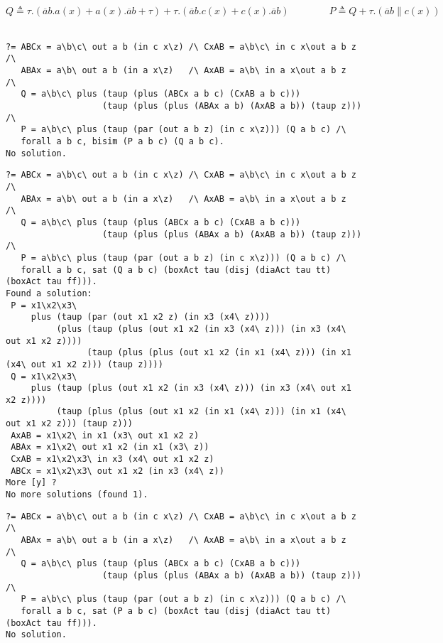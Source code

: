 \documentclass{article}
\newcommand{\ttt}{\mathtt{t\hspace*{-.25em}t}}
\newcommand{\fff}{\mathtt{f\hspace*{-.25em}f}}
\newcommand{\boxm}[1]{\mathopen{\big[ #1 \big]}} %
\newcommand{\diam}[1]{\mathopen{\big\langle #1 \big\rangle}}
\newcommand{\cpar}{\mathrel{\|}}
\newcommand{\co}[1]{\overline{#1}}
\begin{document}
\section{}
\[
Q \triangleq
\mathopen{\tau.}\left(\co{a}{b}.{{a}{(x)}} + {a}{(x)}.{\co{a}{b}} + \tau\right)%
   +
\mathopen{\tau.}\left(\co{a}{b}.{{c}{(x)}} + {c}{(x)}.{\co{a}{b}}\right)%
\qquad\qquad
P \triangleq Q + \mathopen{\tau.}\left(\co{a}{b} \cpar {c}{(x)}\right)
\]
~\\[-.5ex]
\hfill
{\small%
\begin{verbatim}
?= ABCx = a\b\c\ out a b (in c x\z) /\ CxAB = a\b\c\ in c x\out a b z /\
   ABAx = a\b\ out a b (in a x\z)   /\ AxAB = a\b\ in a x\out a b z   /\
   Q = a\b\c\ plus (taup (plus (ABCx a b c) (CxAB a b c)))
                   (taup (plus (plus (ABAx a b) (AxAB a b)) (taup z))) /\
   P = a\b\c\ plus (taup (par (out a b z) (in c x\z))) (Q a b c) /\
   forall a b c, bisim (P a b c) (Q a b c).
No solution.
\end{verbatim}}
%
\fbox{ $Q \models
\mathopen{\boxm{\tau}}\left( \diam{\tau}\ttt \vee \boxm{\tau}\fff \right)$ }
{\small%
\begin{verbatim}
?= ABCx = a\b\c\ out a b (in c x\z) /\ CxAB = a\b\c\ in c x\out a b z /\
   ABAx = a\b\ out a b (in a x\z)   /\ AxAB = a\b\ in a x\out a b z   /\
   Q = a\b\c\ plus (taup (plus (ABCx a b c) (CxAB a b c)))
                   (taup (plus (plus (ABAx a b) (AxAB a b)) (taup z))) /\
   P = a\b\c\ plus (taup (par (out a b z) (in c x\z))) (Q a b c) /\
   forall a b c, sat (Q a b c) (boxAct tau (disj (diaAct tau tt) (boxAct tau ff))).
Found a solution:
 P = x1\x2\x3\
     plus (taup (par (out x1 x2 z) (in x3 (x4\ z))))
          (plus (taup (plus (out x1 x2 (in x3 (x4\ z))) (in x3 (x4\ out x1 x2 z))))
                (taup (plus (plus (out x1 x2 (in x1 (x4\ z))) (in x1 (x4\ out x1 x2 z))) (taup z))))
 Q = x1\x2\x3\
     plus (taup (plus (out x1 x2 (in x3 (x4\ z))) (in x3 (x4\ out x1 x2 z))))
          (taup (plus (plus (out x1 x2 (in x1 (x4\ z))) (in x1 (x4\ out x1 x2 z))) (taup z)))
 AxAB = x1\x2\ in x1 (x3\ out x1 x2 z)
 ABAx = x1\x2\ out x1 x2 (in x1 (x3\ z))
 CxAB = x1\x2\x3\ in x3 (x4\ out x1 x2 z)
 ABCx = x1\x2\x3\ out x1 x2 (in x3 (x4\ z))
More [y] ? 
No more solutions (found 1).
\end{verbatim}}
%
\fbox{ $P \not\models
\mathopen{\boxm{\tau}}\left( \diam{\tau}\ttt \vee \boxm{\tau}\fff \right)$ }
{\small%
\begin{verbatim}
?= ABCx = a\b\c\ out a b (in c x\z) /\ CxAB = a\b\c\ in c x\out a b z /\
   ABAx = a\b\ out a b (in a x\z)   /\ AxAB = a\b\ in a x\out a b z   /\
   Q = a\b\c\ plus (taup (plus (ABCx a b c) (CxAB a b c)))
                   (taup (plus (plus (ABAx a b) (AxAB a b)) (taup z))) /\
   P = a\b\c\ plus (taup (par (out a b z) (in c x\z))) (Q a b c) /\
   forall a b c, sat (P a b c) (boxAct tau (disj (diaAct tau tt) (boxAct tau ff))).
No solution.
\end{verbatim}}
\end{document}
